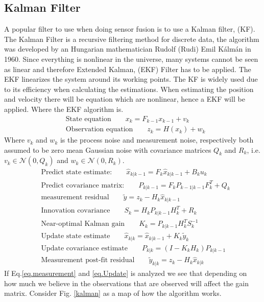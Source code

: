 \subsection{Kalman Filter}
A popular filter to use when doing sensor fusion is to use a Kalman filter, (KF). The Kalman Filter is a recursive filtering method for discrete data, the algorithm was developed by an Hungarian mathematician Rudolf (Rudi) Emil Kálmán in 1960. Since everything is nonlinear in the universe, many systems cannot be seen as linear and therefore Extended Kalman, (EKF) Filter has to be applied. The EKF linearizes the system around its working points. The KF is widely used due to its efficiency when calculating the estimations. When estimating the position and velocity there will be equation which are nonlinear, hence a EKF will be applied. Where the EKF algorithm is.
\begin{align}
&\textrm{State equation} \qquad x_k=F_{k-1}x_{k-1}+v_k\\
& \textrm{Observation equation} \qquad z_k=H(x_k)+w_k
\end{align}
Where $v_k$ and $w_k$ is the process noise and measurement noise, respectively both assumed to be zero mean Gaussian noise with covariance matrices $Q_k$ and $R_k$, i.e. $v_k\in\mathcal{N}(0, Q_k)$ and $w_k\in\mathcal{N}(0, R_k)$.
\begin{align}
&\textrm{Predict state estimate:} \qquad \hat{x}_{k|k-1}=F_k\hat{x}_{k|k-1}+B_ku_k\\
&\textrm{Predict covariance matrix:}\qquad P_{k|k-1}=F_{k}P_{k-1|k-1}F^T_{k}+Q_{k}\\
\label{eq.measurement}
&\textrm{measurement residual}\qquad \tilde{y}=z_k-H_k\hat{x}_{k|k-1}\\
&\textrm{Innovation covariance}\qquad S_k=H_kP_{k|k-1}H_k^T+R_k \\
&\textrm{Near-optimal Kalman gain}\qquad K_k=P_{k|k-1}H_k^TS_k^{-1}\\
\label{eq.Update}
&\textrm{Update state estimate}\qquad \hat{x}_{k|k}=\hat{x}_{k|k-1}+K_k\tilde{y}_k\\
&\textrm{Update covariance estimate}\qquad P_{k|k}=(I-K_kH_k)P_{k|k-1}\\
&\textrm{Measurement post-fit residual} \qquad \tilde{y}_{k|k}=z_k-H_k\hat{x}_{k|k}
\end{align}
If Eq.\eqref{eq.measurement} and \eqref{eq.Update} is analyzed we see that depending on how much we believe in the observations that are observed will affect the gain matrix. Consider Fig. \ref{kalman} as a map of how the algorithm works.
